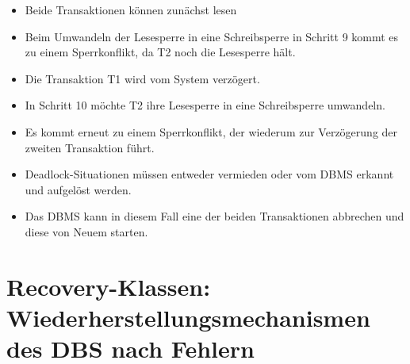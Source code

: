 \documentclass{lehramt-informatik-haupt}
\begin{document}
\begin{itemize}
\item Beide Transaktionen können zunächst lesen

\item Beim Umwandeln der Lesesperre in eine Schreibsperre in Schritt 9
kommt es zu einem Sperrkonflikt, da T2 noch die Lesesperre hält.

\item Die Transaktion T1 wird vom System verzögert.

\item In Schritt 10 möchte T2 ihre Lesesperre in eine Schreibsperre
umwandeln.

\item Es kommt erneut zu einem Sperrkonflikt, der wiederum zur
Verzögerung der zweiten Transaktion führt.
\end{itemize}

\begin{itemize}
\item Deadlock-Situationen müssen entweder vermieden oder vom DBMS
erkannt und aufgelöst werden.

\item Das DBMS kann in diesem Fall eine der beiden Transaktionen
abbrechen und diese von Neuem starten.
\end{itemize}

%

\section{Recovery-Klassen: Wiederherstellungsmechanismen des DBS nach
Fehlern}
\end{document}

